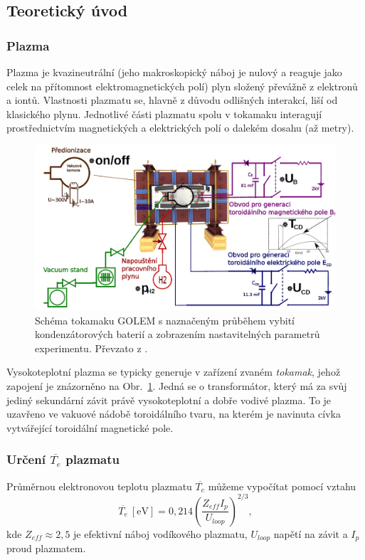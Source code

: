 \documentclass[english]{article}
\newcommand{\unit}[1]{\mathrm{#1}}
\begin{document}
	\subsection{Teoretický úvod}
		\subsubsection{Plazma}
			Plazma je kvazineutrální (jeho makroskopický náboj je nulový a reaguje jako celek na přítomnost elektromagnetických polí) plyn složený převážně z elektronů a iontů. Vlastnosti plazmatu se, hlavně z důvodu odlišných interakcí, liší od klasického plynu. Jednotlivé části plazmatu spolu v tokamaku interagují prostřednictvím magnetických a elektrických polí o dalekém dosahu (až metry). 
			
			\begin{figure}[h]
			\centering
			\includegraphics[width=15cm]{att/tokamak.jpg}
			\caption{Schéma tokamaku GOLEM s naznačeným průběhem vybití kondenzátorových baterií a zobrazením nastavitelných parametrů experimentu. Převzato z \cite{bib:zadani}.}
			\label{fig:s_tokamak}
			\end{figure}			
			
			Vysokoteplotní plazma se typicky generuje v zařízení zvaném \emph{tokamak}, jehož zapojení je znázorněno na Obr.~\ref{fig:s_tokamak}. Jedná se o transformátor, který má za svůj jediný sekundární závit právě vysokoteplotní a dobře vodivé plazma. To je uzavřeno ve vakuové nádobě toroidálního tvaru, na kterém je navinuta cívka vytvářející toroidální magnetické pole. 
			
		\subsubsection[Určení Te plazmatu]{Určení $\overline{T_e}$ plazmatu}
			Průměrnou elektronovou teplotu plazmatu $\overline{T_e}$ můžeme vypočítat pomocí vztahu 
			\begin{equation}
				\overline{T_e}~\unit{[eV]}=0,214\left(\frac{Z_{eff} I_p}{U_{loop}}\right)^{2/3},
				\label{eq:vypocet_prumerne_teploty}
			\end{equation}
			kde $Z_{eff}\approx2,5$ je efektivní náboj vodíkového plazmatu, $U_{loop}$ napětí na závit a $I_p$ proud plazmatem.
			
\end{document}
